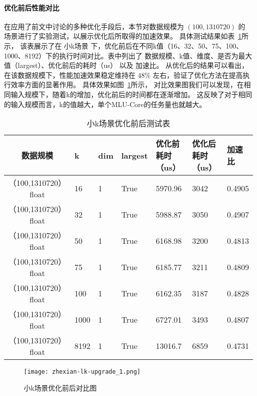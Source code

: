 \paragraph{优化前后性能对比}
在应用了前文中讨论的多种优化手段后，本节对数据规模为 \((100, 1310720)\) 的
场景进行了实验测试，以展示优化后所取得的加速效果。
具体测试结果如表~\ref{tab:bench_littlek_upgrade}所示，
该表展示了在 小k场景 下，优化前后在不同k值（16、32、50、75、100、1000、8192）下的执行时间对比。表中列出了 数据规模、k值、维度、是否为最大值（largest）、优化前后的耗时（us） 以及 加速比。
从优化后的结果可以看出，在该数据规模下，性能加速效果稳定维持在 \(48\%\) 左右，验证了优化方法在提高执行效率方面的显著作用。
具体效果如图~\ref{fig:bench_littlek_upgrade_zhexian}所示，
对比效果图我们可以发现，在相同输入规模下，随着k的增加，优化前后的时间都在逐渐增加。
这反映了对于相同的输入规模而言，k的值越大，单个MLU-Core的任务量也就越大。
\begin{table}
    \centering
    \caption{小k场景优化前后测试表}
    \label{tab:bench_littlek_upgrade}
    \begin{tabular}{cllllll}
        \toprule
        数据规模       &k  & dim  & largest & 优化前耗时（us）    & 优化后耗时（us） &加速比\\
        \midrule
        （100,1310720） float&16&  1     & True      & 5970.96 & 3042 &  0.4905\\
        （100,1310720） float&32&  1     & True      & 5988.87 & 3050 &  0.4907\\
        （100,1310720） float&50&  1     & True      & 6168.98 & 3200 &  0.4813 \\
        （100,1310720） float&75&  1     & True      & 6185.77 & 3211 &  0.4809 \\
        （100,1310720） float&100&  1     & True      & 6162.35& 3187 &  0.4828 \\
        （100,1310720） float&1000&  1     & True      & 6727.01 & 3493 & 0.4807 \\
        （100,1310720） float&8192&  1     & True      & 13016.7 & 6859 & 0.4731 \\
        
        \bottomrule
    \end{tabular}
    \end{table}

\begin{figure}[ht]
        \centering
        \texttt{[image: zhexian-lk-upgrade\_1.png]}
        \caption{小k场景优化前后对比图}
        \label{fig:bench_littlek_upgrade_zhexian}
    \end{figure}
    


